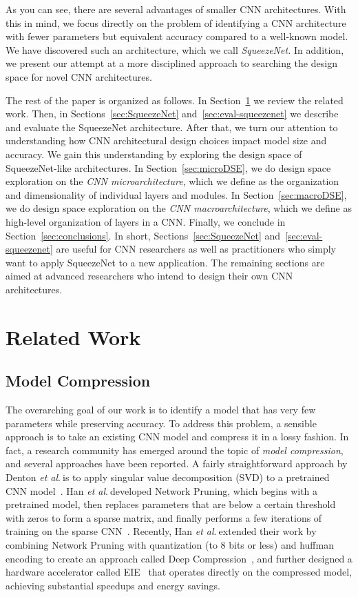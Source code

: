 \documentclass{article} \usepackage{iclr2017_conference,times}
\newcommand{\etal}{\textit{et al}.$~$}
\renewcommand{\cite}{\citep}
\def\vsp{\vspace{-0.15in}}
\begin{document}
As you can see, there are several advantages of smaller CNN architectures.
With this in mind, we focus directly on the problem of identifying a CNN architecture with fewer parameters but equivalent accuracy compared to a well-known model.
We have discovered such an architecture, which we call {\em SqueezeNet.}
In addition, we present our attempt at a more disciplined approach to searching the design space for novel CNN architectures.

The rest of the paper is organized as follows. 
In Section~\ref{sec:related} we review the related work.
Then, in Sections~\ref{sec:SqueezeNet} and~\ref{sec:eval-squeezenet} we describe and evaluate the SqueezeNet architecture. After that, we turn our attention to understanding how CNN architectural design choices impact model size and accuracy.
We gain this understanding by exploring the design space of SqueezeNet-like architectures.
In Section~\ref{sec:microDSE}, we do design space exploration on the {\em CNN microarchitecture}, which we define as the organization and dimensionality of individual layers and modules.
In Section~\ref{sec:macroDSE}, we do design space exploration on the {\em CNN macroarchitecture}, which we define as high-level organization of layers in a CNN.
Finally, we conclude in Section~\ref{sec:conclusions}.
In short, Sections~\ref{sec:SqueezeNet} and~\ref{sec:eval-squeezenet} are useful for CNN researchers as well as practitioners who simply want to apply SqueezeNet to a new application.
The remaining sections are aimed at advanced researchers who intend to design their own CNN architectures. 

\section{Related Work}
\label{sec:related}
\vsp

\subsection{Model Compression}
\label{sec:related-model-compression}
\vsp

The overarching goal of our work is to identify a model that has very few parameters while preserving accuracy.
To address this problem, a sensible approach is to take an existing CNN model and compress it in a lossy fashion.
In fact, a research community has emerged around the topic of {\em model compression}, and several approaches have been reported.
A fairly straightforward approach by Denton \etal is to apply singular value decomposition (SVD) to a pretrained CNN model~\cite{facebook-compress-2014}.
Han \etal developed Network Pruning, which begins with a pretrained model, then replaces parameters that are below a certain threshold with zeros to form a sparse matrix, and finally performs a few iterations of training on the sparse CNN~\cite{dally2015-1}.
Recently, Han \etal extended their work by combining Network Pruning with quantization (to 8 bits or less) and huffman encoding to create an approach called Deep Compression~\cite{dally2015-2}, and further designed a hardware accelerator called EIE~\cite{EIE} that operates directly on the compressed model, achieving substantial speedups and energy savings.
\end{document}
